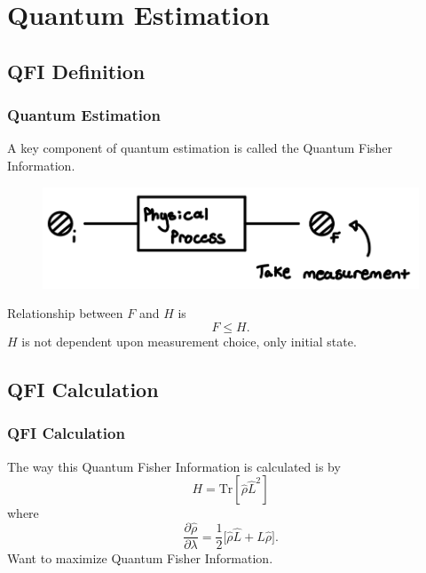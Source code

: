 \documentclass{beamer}
\begin{document}
\section{Quantum Estimation}
\subsection{\tiny{QFI Definition}}
\begin{frame}
\frametitle{Quantum Estimation}
A key component of quantum estimation is called the Quantum Fisher Information.
\begin{figure}
\begin{center}
\includegraphics[width=0.75\linewidth]{Quantum-Estimation-Cartoon.jpeg}
\end{center}
\end{figure}
Relationship between $F$ and $H$ is
\begin{equation}\label{eq:26}
F\leq H.
\end{equation}
$H$ is not dependent upon measurement choice, only initial state.
\end{frame}
\subsection{\tiny{QFI Calculation}}
\begin{frame}
\frametitle{QFI Calculation}
The way this Quantum Fisher Information is calculated is by
\begin{equation}\label{eq:24}
H=\text{Tr}[\hat{\rho}\hat{L}^2]
\end{equation}
where 
\begin{equation}\label{eq:25}
\frac{\partial\hat{\rho}}{\partial\lambda}=\frac{1}{2}\big[\hat{\rho}\hat{L}+\hat{L}\hat{\rho}\big].
\end{equation}
Want to maximize Quantum Fisher Information.
\end{frame}
\end{document}
